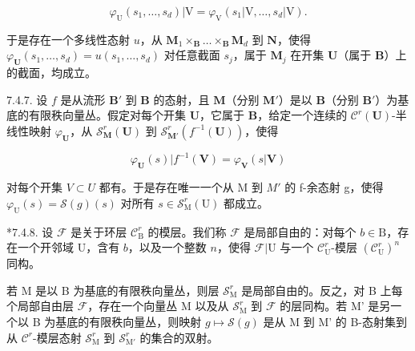 \[
\varphi_ {\mathrm{U}} (s _ {1}, \dots , s _ {d}) | \mathrm{V} = \varphi_ {\mathrm{V}} (s _ {1} | \mathrm{V}, \dots , s _ {d} | \mathrm{V}).
\]

于是存在一个多线性态射 \(u\)，从 \(\mathbf{M}_1 \times_{\mathbf{B}} \ldots \times_{\mathbf{B}} \mathbf{M}_d\) 到 \(\mathbf{N}\)，使得 \(\varphi_{\mathbf{U}}(s_1, \ldots, s_d) = u(s_1, \ldots, s_d)\) 对任意截面 \(s_j\)，属于 \(\mathbf{M}_j\) 在开集 \(\mathbf{U}\)（属于 \(\mathbf{B}\)）上的截面，均成立。

7.4.7. 设 \(f\) 是从流形 \(\mathbf{B}'\) 到 \(\mathbf{B}\) 的态射，且 \(\mathbf{M}\)（分别 \(\mathbf{M}'\)）是以 \(\mathbf{B}\)（分别 \(\mathbf{B}'\)）为基底的有限秩向量丛。假定对每个开集 \(\mathbf{U}\)，它属于 \(\mathbf{B}\)，给定一个连续的 \(\mathcal{C}^{r}(\mathbf{U})\)-半线性映射 \(\varphi_{\mathbf{U}}\)，从 \(\mathcal{S}_{\mathbf{M}}^{r}(\mathbf{U})\) 到 \(\mathcal{S}_{\mathbf{M}'}^{r}(f^{-1}(\mathbf{U}))\)，使得

\[
\varphi_ {\mathbf {U}} (s) | f ^ {- 1} (\mathbf {V}) = \varphi_ {\mathbf {V}} (s | \mathbf {V})
\]

对每个开集 \(V \subset U\) 都有。于是存在唯一一个从 M 到 \(M'\) 的 f-余态射 g，使得 \(\varphi_{\mathrm{U}}(s) = \mathcal{S}(g)(s)\) 对所有 \(s \in \mathcal{S}_{\mathrm{M}}^{r}(\mathrm{U})\) 都成立。

*7.4.8. 设 \(\mathcal{F}\) 是关于环层 \(\mathcal{C}_{\mathrm{B}}^{r}\) 的模层。我们称 \(\mathcal{F}\) 是局部自由的：对每个 \(b \in \mathrm{B}\)，存在一个开邻域 U，含有 \(b\)，以及一个整数 \(n\)，使得 \(\mathcal{F}|\mathrm{U}\) 与一个 \(\mathcal{C}_{\mathrm{U}}^{r}\)-模层 \((\mathcal{C}_{\mathrm{U}}^{r})^{n}\) 同构。

若 M 是以 B 为基底的有限秩向量丛，则层 \(\mathcal{S}_{\mathrm{M}}^{r}\) 是局部自由的。反之，对 B 上每个局部自由层 \(\mathcal{F}\)，存在一个向量丛 M 以及从 \(\mathcal{S}_{\mathrm{M}}^{r}\) 到 \(\mathcal{F}\) 的层同构。若 M' 是另一个以 B 为基底的有限秩向量丛，则映射 \(g \mapsto \mathcal{S}(g)\) 是从 M 到 M' 的 B-态射集到从 \(\mathcal{C}^{r}\)-模层态射 \(\mathcal{S}_{\mathrm{M}}^{r}\) 到 \(\mathcal{S}_{\mathrm{M}'}^{r}\) 的集合的双射。

